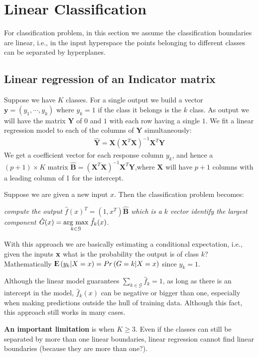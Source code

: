 
\section{Linear Classification}
For classification problem, in this section we assume the classification boundaries are linear, i.e., in the input hyperspace the points belonging to different classes can be separated by hyperplanes. 

\subsection{Linear regression of an Indicator matrix}
Suppose we have $K$ classes. For a single output we build a vector $\mathbf{y} = \left( y_1, \cdots, y_k\right)$ where $y_k=1$ if the class it belongs is the $k$ class. As output we will have the matrix $\mathbf{Y}$ of $0$ and $1$ with each row having a single $1$. We fit a linear regression model to each of the columns of $\mathbf{Y}$ simultaneously:
\begin{align*}
\hat{\mathbf{Y}} = \mathbf{X}\left( \mathbf{X}^T\mathbf{X}\right)^{-1}\mathbf{X}^T\mathbf{Y}
\end{align*}
We get a coefficient vector for each response column $y_k$, and hence a $(p+1) \times K$ matrix $\hat{\mathbf{B}} = \left( \mathbf{X}^T\mathbf{X}\right)^{-1}\mathbf{X}^T\mathbf{Y}$,where $\mathbf{X}$ will have $p+1$ columns with a leading column of 1 for the intercept.

Suppose we are given a new input $x$. Then the classification problem becomes:

\textit{compute the output $\hat{f}(x)^T = (1, x^T)\mathbf{\hat{B}}$ which is a $k$ vector
identify the largest component $\hat{G}(x) = \underset{k \in \mathcal{G}}{\operatorname{arg}\,\operatorname{max}}\; \hat{f}_k(x)$}.

With this approach we are basically estimating a conditional expectation, i.e., given the inputs $\mathbf{x}$ what is the probability the output is of class $k$? Mathematically ${\rm I\kern-.3em E}\left( y_k|X=x\right) =  Pr\left( G=k|X=x\right)$ since $y_k=1$.

Although the linear model guarantees $\sum_{k \in \mathcal{G}}\hat{f}_k=1$, as long as there is an intercept in the model, $\hat{f}_k(x)$ can be negative or bigger than one, especially when making predictions outside the hull of training data. Although this fact, this approach still works in many cases.

\textbf{An important limitation} is when $K\ge 3$. Even if the classes can still be separated by more than one linear boundaries, linear regression cannot find linear boundaries (because they are more than one?).

